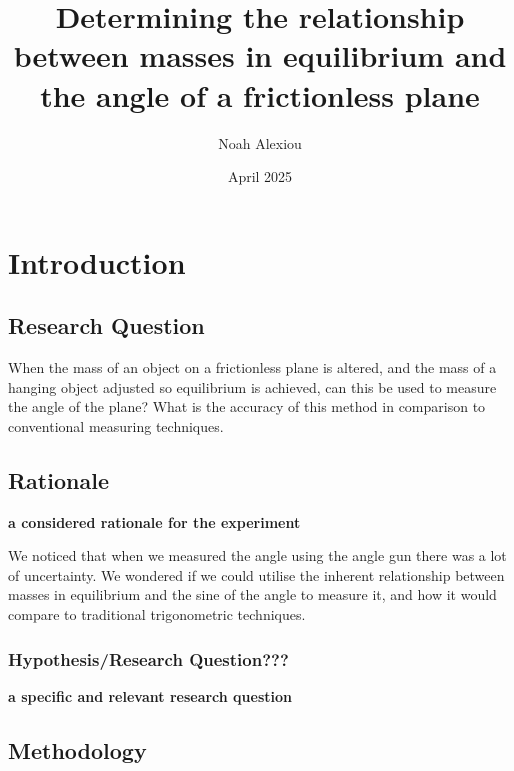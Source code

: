 \documentclass[12pt,a4paper]{article}
\begin{document}
\begin{titlepage}


\title{Determining the relationship between masses in equilibrium and the angle of a frictionless plane}

\author{Noah Alexiou}


\date{April 2025}

\maketitle
\centering

\end{titlepage}
\tableofcontents
\newpage

\section{Introduction}

\subsection{Research Question}
When the mass of an object on a frictionless plane is altered, and the mass of a hanging object adjusted so  equilibrium is achieved, can this be used to measure the angle of the plane? What is the accuracy of this method in comparison to conventional measuring techniques. 

\subsection{Rationale}

\textbf{a considered rationale for the experiment}

We noticed that when we measured the angle using the angle gun there was a lot of uncertainty. We wondered if we could utilise the inherent relationship between masses in equilibrium and the sine of the angle to measure it, and how it would compare to traditional trigonometric techniques.



\subsubsection{Hypothesis/Research Question???}
\textbf{a specific and relevant research question}

\subsection{Methodology}
\end{document}
